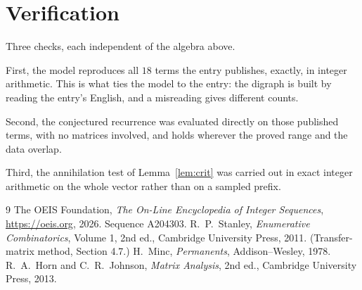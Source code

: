 \documentclass[11pt,a4paper]{article}
\theoremstyle{plain}
\theoremstyle{definition}
\begin{document}
\section{Verification}

Three checks, each independent of the algebra above.

First, the model reproduces all $18$ terms the entry publishes, exactly, in integer
arithmetic. This is what ties the model to the entry: the digraph is built by reading the
entry's English, and a misreading gives different counts.

Second, the conjectured recurrence was evaluated directly on those published terms, with no
matrices involved, and holds wherever the proved range and the data overlap.

Third, the annihilation test of Lemma~\ref{lem:crit} was carried out in exact integer
arithmetic on the whole vector rather than on a sampled prefix.

\begin{thebibliography}{9}
 The OEIS Foundation, \emph{The On-Line Encyclopedia of Integer
Sequences}, \url{https://oeis.org}, 2026. Sequence A204303.
 R.~P.~Stanley, \emph{Enumerative Combinatorics}, Volume 1, 2nd ed.,
Cambridge University Press, 2011. (Transfer-matrix method, Section 4.7.)
 H.~Minc, \emph{Permanents}, Addison--Wesley, 1978.
 R.~A.~Horn and C.~R.~Johnson, \emph{Matrix Analysis}, 2nd ed., Cambridge
University Press, 2013.
\end{thebibliography}
\end{document}
